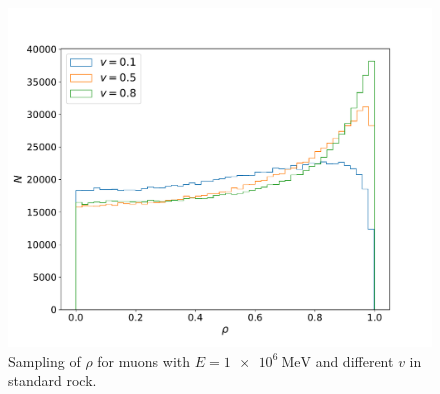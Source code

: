 \documentclass[aspectratio=1610, captions=tableheading, 11pt]{beamer}
\begin{document}
\begin{frame}
\vspace{-3mm}

\begin{figure}
    \centering
    \includegraphics[height=0.9\textheight, trim=0.3cm 0.5cm 0.3cm 2cm,clip=true]{plots/plot_01.pdf}
    \caption*{Sampling of $\rho$ for muons with $E = \SI{1e6}{\mega\electronvolt}$ and different $v$ in standard rock.}
    \label{fig:1}
\end{figure}

\end{frame}

\end{document}
